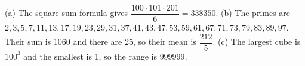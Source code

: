(a) The square-sum formula gives $\dfrac{100\cdot101\cdot201}{6}=\boxed{338350}$. (b) The primes are $2,3,5,7,11,13,17,19,23,29,31,37,41,43,47,53,59,61,67,71,73,79,83,89,97$. Their sum is 1060 and there are 25, so their mean is $\boxed{\dfrac{212}{5}}$. (c) The largest cube is $100^3$ and the smallest is 1, so the range is $\boxed{999999}$.
